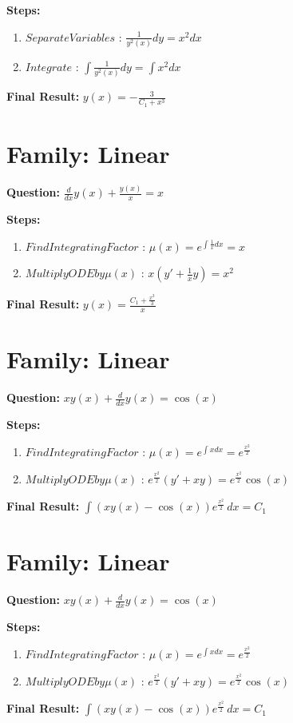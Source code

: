 \documentclass{article}
\begin{document}
\textbf{Steps:}
\begin{enumerate}
\item $Separate Variables$ :  $\frac{1}{y^{2}{\left(x \right)}} dy = x^{2} dx$
\item $Integrate$ :  $\int \frac{1}{y^{2}{\left(x \right)}} dy = \int x^{2} dx$
\end{enumerate}
\textbf{Final Result:} $y{\left(x \right)} = - \frac{3}{C_{1} + x^{3}}$

\section*{Family: Linear}
\textbf{Question:} $\frac{d}{d x} y{\left(x \right)} + \frac{y{\left(x \right)}}{x} = x$

\textbf{Steps:}
\begin{enumerate}
\item $Find Integrating Factor$ :  $\mu(x) = e^{\int \frac{1}{x} dx} = x$
\item $Multiply ODE by \mu(x)$ :  $x(y' + \frac{1}{x}y) = x^{2}$
\end{enumerate}
\textbf{Final Result:} $y{\left(x \right)} = \frac{C_{1} + \frac{x^{3}}{3}}{x}$

\section*{Family: Linear}
\textbf{Question:} $x y{\left(x \right)} + \frac{d}{d x} y{\left(x \right)} = \cos{\left(x \right)}$

\textbf{Steps:}
\begin{enumerate}
\item $Find Integrating Factor$ :  $\mu(x) = e^{\int x dx} = e^{\frac{x^{2}}{2}}$
\item $Multiply ODE by \mu(x)$ :  $e^{\frac{x^{2}}{2}}(y' + xy) = e^{\frac{x^{2}}{2}} \cos{\left(x \right)}$
\end{enumerate}
\textbf{Final Result:} $\int \left(x y{\left(x \right)} - \cos{\left(x \right)}\right) e^{\frac{x^{2}}{2}}\, dx = C_{1}$

\section*{Family: Linear}
\textbf{Question:} $x y{\left(x \right)} + \frac{d}{d x} y{\left(x \right)} = \cos{\left(x \right)}$

\textbf{Steps:}
\begin{enumerate}
\item $Find Integrating Factor$ :  $\mu(x) = e^{\int x dx} = e^{\frac{x^{2}}{2}}$
\item $Multiply ODE by \mu(x)$ :  $e^{\frac{x^{2}}{2}}(y' + xy) = e^{\frac{x^{2}}{2}} \cos{\left(x \right)}$
\end{enumerate}
\textbf{Final Result:} $\int \left(x y{\left(x \right)} - \cos{\left(x \right)}\right) e^{\frac{x^{2}}{2}}\, dx = C_{1}$
\end{document}
